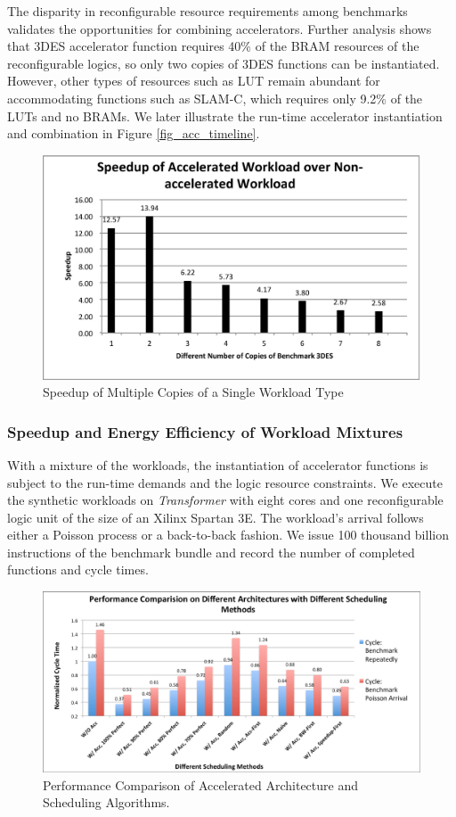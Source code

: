 The disparity in reconfigurable resource requirements among benchmarks
validates the opportunities for combining accelerators. Further
analysis shows that 3DES accelerator function requires 40\% of 
the BRAM resources of the reconfigurable logics, so only two copies of
3DES functions can be instantiated. However, other types of
resources such as LUT remain abundant for accommodating
functions such as SLAM-C, which requires only 9.2\% of the LUTs and no
BRAMs. We later illustrate the run-time accelerator instantiation and combination in Figure
\ref{fig_acc_timeline}.   

\begin{figure}
    \centering
    \includegraphics[width=4.5in]{Increase-Num-of-Apps}
    \caption{Speedup of Multiple Copies of a Single Workload Type}
    \label{fig_num_of_apps}
\end{figure}

\subsubsection{Speedup and Energy Efficiency of Workload Mixtures}

With a mixture of the workloads, the instantiation of accelerator
functions is subject to the run-time demands and the logic resource
constraints. We execute the synthetic workloads on {\em Transformer} with eight
cores and one reconfigurable logic unit of the size of an Xilinx
Spartan 3E. The workload's arrival follows either a Poisson process or
a back-to-back fashion.  We issue 100 thousand billion instructions of
the benchmark bundle and record the number of completed functions and
cycle times. 

\begin{figure}
    \centering
    \includegraphics[width=4.5in]{Cycle-8core}
    \caption{Performance Comparison of Accelerated Architecture and Scheduling Algorithms.}
    \label{fig_8core_cycle}
\end{figure}

